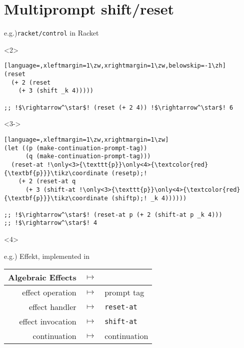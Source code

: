\section{Multiprompt shift/reset}
\begin{frame}[t,fragile]
  \frametitlesec

  \pause
  e.g.)\texttt{racket/control} in Racket

  \begin{onlyenv}<2>
    \begin{lstlisting}[language=,xleftmargin=1\zw,xrightmargin=1\zw,belowskip=-1\zh]
(reset
  (+ 2 (reset
    (+ 3 (shift _k 4)))))

;; !$\rightarrow^\star$! (reset (+ 2 4)) !$\rightarrow^\star$! 6
    \end{lstlisting}
  \end{onlyenv}
  \begin{onlyenv}<3->
    \begin{lstlisting}[language=,xleftmargin=1\zw,xrightmargin=1\zw]
(let ((p (make-continuation-prompt-tag))
      (q (make-continuation-prompt-tag)))
  (reset-at !\only<3>{\texttt{p}}\only<4>{\textcolor{red}{\textbf{p}}}\tikz\coordinate (resetp);!
    (+ 2 (reset-at q
      (+ 3 (shift-at !\only<3>{\texttt{p}}\only<4>{\textcolor{red}{\textbf{p}}}\tikz\coordinate (shiftp);! _k 4))))))

;; !$\rightarrow^\star$! (reset-at p (+ 2 (shift-at p _k 4)))
;; !$\rightarrow^\star$! 4
    \end{lstlisting}
  \end{onlyenv}
  \begin{onlyenv}<4>
  \end{onlyenv}
\end{frame}

\begin{frame}
  \frametitlesec

  e.g.)  \alert{Effekt}, implemented in 

  \pause
  \begin{table}[ht]
    \centering
    \begin{tabular}{rcl}
      \alert{Algebraic Effects} & $\mapsto$ & \parbox{6em}{}\\
      \hline
      effect operation  & $\mapsto$ & prompt tag\\
      effect handler    & $\mapsto$ & \texttt{reset-at}\\
      effect invocation & $\mapsto$ & \texttt{shift-at}\\
      continuation & $\mapsto$ & continuation
    \end{tabular}
  \end{table}
\end{frame}


